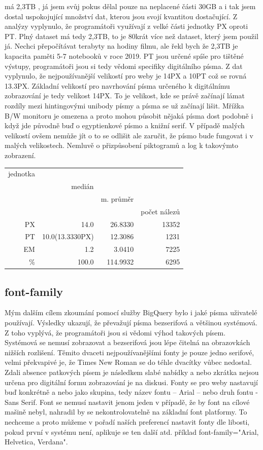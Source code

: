 \documentclass[a4paper]{article}
\begin{document}
\begin{enumerate}
{} má 2,3TB , já jsem svůj pokus dělal pouze na neplacené části 30GB a i tak jsem dostal uspokojující množství dat, kterou jsou svojí kvantitou dostačující. Z analýzy vyplynulo, že programátoři využívají z velké části jednotky PX oproti PT. Plný dataset má tedy 2,3TB, to je 80krát více než dataset, který jsem použil já. Nechci přepočítávat terabyty na hodiny filmu, ale řekl bych že 2,3TB je kapacita paměti 5-7 notebooků v roce 2019.  PT jsou určené spíše pro tištěné výstupy, programátoři jsou si tedy vědomi specifiky digitálního písma. Z dat vyplynulo, že nejpoužívanější velikostí pro weby je 14PX a 10PT což se rovná 13.3PX. Základní velikostí pro navrhování písma určeného k digitálnímu zobrazování je tedy velikost 14PX. To je velikost, kde se právě začínají lámat rozdíly mezi hintingovými unibody písmy a písma se už začínají lišit. Mřížka B/W monitoru je omezena a proto mohou působit nějaká písma dost podobně i když jde původně buď o egyptienkové písmo a knižní serif. V případě malých velikostí ovšem nemůže jít o to se odlišit ale zaručit, že písmo bude fungovat i v malých velikostech. Nemluvě o přizpůsobení piktogramů a log k takovýmto zobrazení.

\begin{tabular}{r|rrr}
jednotka & \\
& medián & \\
& & m. průměr & \\
& & & počet nálezů\\
\midrule
PX & 14.0 & 26.8330 &13352 \\
PT & 10.0(13.3330PX)  & 12.3086 & 1231 \\
EM & 1.2 & 3.0410 & 7225 \\
\% & 100.0 & 114.9932 & 6295\\
\end{tabular}

\subsection{font-family}
Mým dalším cílem zkoumání pomocí služby BigQuery bylo i jaké písma uživatelé používají. Výsledky ukazují, že převažují písma bezserifová a většinou systémová. Z toho vyplývá, že programátoři jsou si vědomi výhod takových písem. Systémová se nemusí zobrazovat a bezserifová jsou lépe čitelná na obrazovkách nižších rozlišení. Těmito dvaceti nejpoužívanějšími fonty je pouze jedno serifové, velmi překvapivé je, že Times New Roman se do téhle dvacítky vůbec nedostal. Zdali absence patkových písem je následkem slabé nabídky a nebo zkrátka nejsou určena pro digitální formu zobrazování je na diskusi. Fonty se pro weby nastavují buď konkrétně a nebo jako skupina, tedy název fontu – Arial – nebo druh fontu - Sans Serif. Font se nemusí nastavit jenom jeden v případě, že by font na cílové mašině nebyl, nahradil by se nekontrolovatelně na základní font platformy. To nechceme a proto můžeme v pořadí naších preferencí nastavit fonty dle libosti, pokud první v systému není, aplikuje se ten další atd. příklad font-family="Arial, Helvetica, Verdana".


\end{enumerate}
\end{document}
